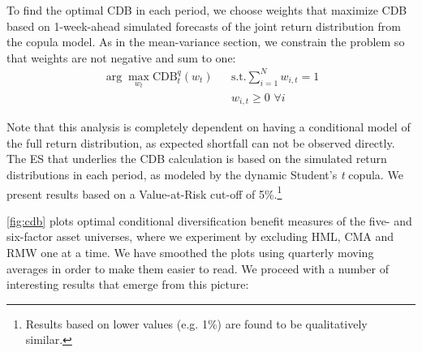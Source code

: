 To find the optimal CDB in each period, we choose weights that maximize CDB based on 1-week-ahead simulated forecasts of the joint return distribution from the copula model. As in the mean-variance section, we constrain the problem so that weights are not negative and sum to one:
\begin{align*}
  \arg\!\max_{w_t} \text{CDB}_t^q(w_t)
    && \text{s.t.} \sum_{i=1}^N w_{i,t} = 1 \\
    && w_{i,t} \ge 0 \,\, \forall i
\end{align*}

Note that this analysis is completely dependent on having a conditional model of the full return distribution, as expected shortfall can not be observed directly. The ES that underlies the CDB calculation is based on the simulated return distributions in each period, as modeled by the dynamic Student's \textit{t} copula. We present results based on a Value-at-Risk cut-off of 5\%.\footnote{Results based on lower values (e.g. 1\%) are found to be qualitatively similar.} 

\autoref{fig:cdb} plots optimal conditional diversification benefit measures of the five- and six-factor asset universes, where we experiment by excluding HML, CMA and RMW one at a time. We have smoothed the plots using quarterly moving averages in order to make them easier to read. We proceed with a number of interesting results that emerge from this picture:

